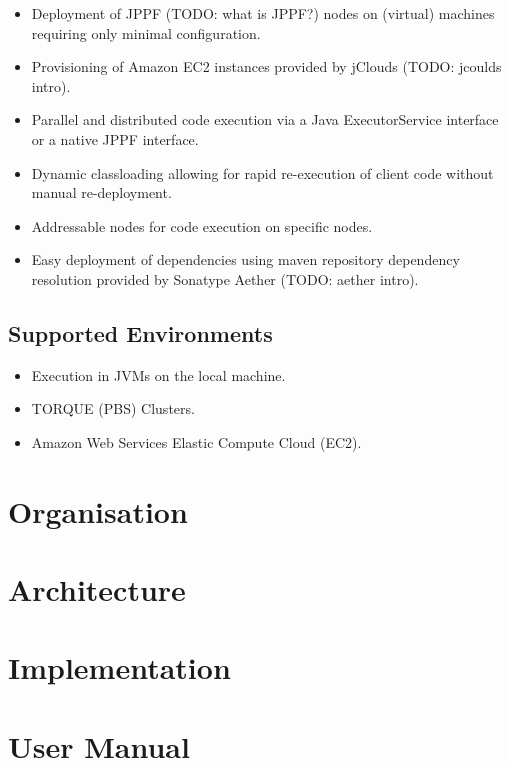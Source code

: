 \documentclass[english]{uzhpub}
\begin{document}
\begin{itemize}
\item Deployment of JPPF (TODO: what is JPPF?) nodes on (virtual) machines requiring only minimal configuration.
\item Provisioning of Amazon EC2 instances provided by jClouds (TODO: jcoulds intro).
\item Parallel and distributed code execution via a Java ExecutorService interface or a native JPPF interface.
\item Dynamic classloading allowing for rapid re-execution of client code without manual re-deployment.
\item Addressable nodes for code execution on specific nodes.
\item Easy deployment of dependencies using maven repository dependency resolution provided by Sonatype Aether (TODO: aether intro).
\end{itemize}

\subsection{Supported Environments}
\begin{itemize}
\item Execution in JVMs on the local machine.
\item TORQUE (PBS) Clusters.
\item Amazon Web Services Elastic Compute Cloud (EC2).
\end{itemize}

\section{Organisation}



\section{Architecture}



\section{Implementation}



\section{User Manual}
\end{document}
